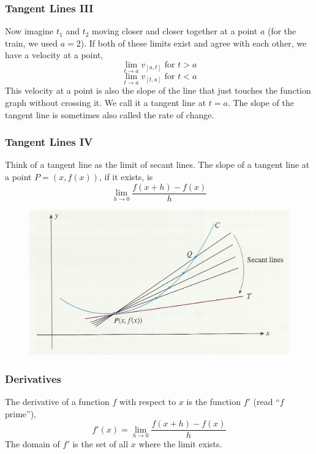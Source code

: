 \documentclass[xcolor=dvipsnames]{beamer}
\begin{document}
\begin{frame}
  \frametitle{Tangent Lines III}
  Now imagine $t_{1}$ and $t_{2}$ moving closer and closer together at
  a point $a$ (for the train, we used $a=2$). If both of these limits
  exist and agree with each other, we have a velocity at a point,
\begin{equation}
  \label{eq:aixohshi}
  \lim_{t\rightarrow{}a}v_{[a,t]}\mbox{ for }t>a
\end{equation}
\begin{equation}
  \label{eq:oongahgh}
  \lim_{t\rightarrow{}a}v_{[t,a]}\mbox{ for }t<a
\end{equation}
This velocity at a point is also the slope of the line that just
touches the function graph without crossing it. We call it a
\alert{tangent line} at $t=a$. The slope of the tangent line is
sometimes also called the \alert{rate of change}.
\end{frame}

\begin{frame}
  \frametitle{Tangent Lines IV}
  Think of a tangent line as the limit of secant lines. The slope of a
  tangent line at a point $P=(x,f(x))$, if it exists, is
\begin{equation}
  \label{eq:cheevooj}
  \lim_{h\rightarrow{}0}\frac{f(x+h)-f(x)}{h}
\end{equation}
  \begin{figure}[h]
    \includegraphics[scale=.7]{./diagrams/tangent1.png}
  \end{figure}
\end{frame}

\begin{frame}
  \frametitle{Derivatives}
The derivative of a function $f$ with respect to $x$ is the function
$f'$ (read ``$f$ prime''),
\begin{equation}
  \label{eq:lohfasoe}
f'(x)=\lim_{h\rightarrow{}0}\frac{f(x+h)-f(x)}{h}
\end{equation}
The domain of $f'$ is the set of all $x$ where the limit exists.
\end{frame}
\end{document}
